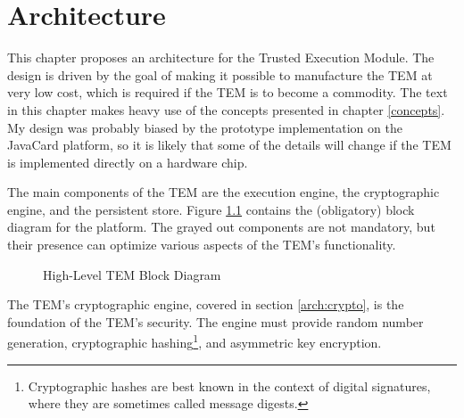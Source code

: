 \chapter{Architecture}\label{arch}
This chapter proposes an architecture for the Trusted Execution Module. The
design is driven by the goal of making it possible to manufacture the TEM at very low
cost, which is required if the TEM is to become a commodity. The text in this
chapter makes heavy use of the concepts presented in chapter \ref{concepts}. My
design was probably biased by the prototype implementation on the JavaCard
platform, so it is likely that some of the details will change if the TEM is
implemented directly on a hardware chip.

The main components of the TEM are the execution engine, the cryptographic
engine, and the persistent store. Figure \ref{fig:tem_overview} contains the
(obligatory) block diagram for the platform. The grayed out components are
not mandatory, but their presence can optimize various aspects of the TEM's
functionality.

\begin{figure}[hbtp]
	\caption{High-Level TEM Block Diagram}
	\label{fig:tem_overview}
\end{figure}

The TEM's cryptographic engine, covered in section \ref{arch:crypto}, is the
foundation of the TEM's security. The engine must provide random number
generation, cryptographic hashing\footnote{Cryptographic hashes are best
known in the context of digital signatures, where they are sometimes called
message digests.}, and asymmetric key encryption.

